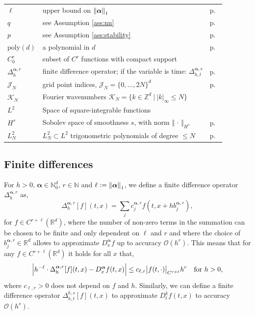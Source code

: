 \documentclass{article}
\numberwithin{equation}{section}
\newcommand{\poly}{\mathrm{poly}}
\newcommand{\slot}{{\,\cdot\,}}
\newcommand{\R}{\mathbb{R}}
\newcommand{\N}{\mathbb{N}}
\newcommand{\Z}{\mathbb{Z}}
\newcommand{\cJ}{\mathcal{J}}
\newcommand{\cK}{\mathcal{K}}
\newcommand{\bmalpha}{{\bm{\alpha}}}
\newcommand{\1}{\mathbbm{1}}
\newcommand{\bigO}{\mathcal{O}}
\begin{document}
\begin{table}[h!]
\begin{tabular}{l p{}  r}
$\ell$ & upper bound on $\norm{\bmalpha}_1$ &  p.~\pageref{ass:diff-operator} \\
$q$ & see Assumption \ref{ass:nn} & p.~\pageref{ass:nn} \\ 
$p$ & see Assumption \ref{ass:stability} & p.~\pageref{ass:stability} \\ 
$\poly(d)$ & a polynomial in $d$ & p.~\pageref{ass:stability} \\ 
$C^r_0$ & subset of $C^r$ functions with compact support & \\
$\Delta^{\bmalpha,r}_h$ & finite difference operator; if the variable is time: $\Delta^{\bmalpha,s}_{h,t}$ & p.~\pageref{app:FD} \\
$\cJ_N$ & grid point indices, $\cJ_N = \{0,\dots, 2N\}^d$ & p.~\pageref{app:sobolev} \\
$\cK_N$ & Fourier wavenumbers $\cK_N = \{k\in \Z^d\:\vert\: |k|_\infty \le N\}$ & \\
$L^2$ & Space of square-integrable functions &  \\
$H^s$ & Sobolev space of smoothness $s$, with norm $\Vert \slot \Vert_{H^s}$ & p.~\pageref{app:sobolev} \\
$L^2_N$ & $L^2_N\subset L^2$ trigonometric polynomials of degree $\le N$ & p.~\pageref{app:trig-pol} \\
\bottomrule
\end{tabular}

\end{table}

\subsection{Finite differences}\label{app:FD}

For $h>0$, $\bmalpha\in\N^d_0$, $r\in\N$ and $\ell := \norm{\bmalpha}_1$, we define a finite difference operator $\Delta^{\bmalpha,r}_h$ as, 
\begin{equation}
    \Delta^{\bmalpha,r}_{h}[f](t,x) = \sum_{j}%
    c_{j}^{\bmalpha,r}f(t,x+h b_j^{\bmalpha,r}),%
\end{equation}
for $f\in C^{r+\ell}(\R^d)$, where the number of non-zero terms in the summation can be chosen to be finite and only dependent on $\ell$ and $r$ and where the choice of $b_j^{\bmalpha,r}\in\R^d$ allows to approximate $D^\bmalpha_x f$ up to accuracy $\bigO(h^r)$. This means that for any $f\in C^{r+\ell}(\R^d)$ it holds for all $x$ that, 
\begin{equation}\label{eq:accuracy-FD}
 \abs{h^{-\ell}\cdot \Delta^{\bmalpha,r}_{h}[f](t,x) - D^\bmalpha_x f(t,x)} \leq c_{\ell,r} \abs{f(t,\cdot)}_{C^{r+\ell}}h^r \quad \text{for } h> 0, 
\end{equation}
where $c_{\ell,r}>0$ does not depend on $f$ and $h$. Similarly, we can define a finite difference operator $\Delta^{k,s}_{h,t}[f](t,x)$ to approximate $D^k_tf(t,x)$ to accuracy $\bigO(h^s)$.
\end{document}
